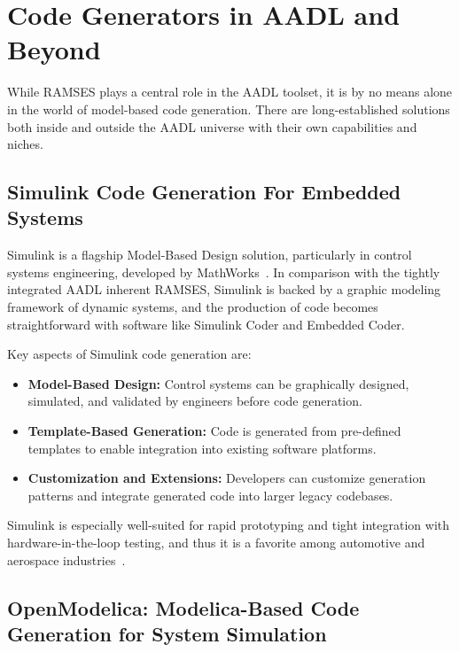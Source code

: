 \section{Code Generators in AADL and Beyond} \label{sub:code_generators}

While \gls{RAMSES} plays a central role in the \gls{AADL} toolset, it is by no means alone in the world of model-based code generation. There are long-established solutions both inside and outside the \gls{AADL} universe with their own capabilities and niches.


\subsection{Simulink Code Generation For Embedded Systems}
\label{sec:simulink}

Simulink is a flagship Model-Based Design solution, particularly in control systems engineering, developed by MathWorks~\cite{simulink_documentation}. In comparison with the tightly integrated \gls{AADL} inherent \gls{RAMSES}, Simulink is backed by a graphic modeling framework of dynamic systems, and the production of code becomes straightforward with software like Simulink Coder and Embedded Coder.

Key aspects of Simulink code generation are:
 \begin{itemize} 
 	\item \textbf{Model-Based Design:} Control systems can be graphically designed, simulated, and validated by engineers before code generation. 
 	\item \textbf{Template-Based Generation:} Code is generated from pre-defined templates to enable integration into existing software platforms. 
 	\item \textbf{Customization and Extensions:} Developers can customize generation patterns and integrate generated code into larger legacy codebases. 
 \end{itemize}

Simulink is especially well-suited for rapid prototyping and tight integration with hardware-in-the-loop testing, and thus it is a favorite among automotive and aerospace industries~\cite{Simulink_automotive_applications}.

\subsection{OpenModelica: Modelica-Based Code Generation for System Simulation}
\label{sec:openModelIntro}


